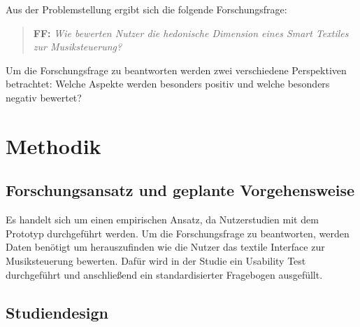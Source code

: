 \documentclass[12pt, a4paper]{article}
\begin{document}
Aus der Problemstellung ergibt sich die folgende Forschungsfrage:
\begin{quote}
  \textbf{FF:} \textit{Wie bewerten Nutzer die hedonische Dimension eines Smart Textiles zur Musiksteuerung?}
\end{quote}

Um die Forschungsfrage zu beantworten werden zwei verschiedene Perspektiven betrachtet: Welche Aspekte werden besonders positiv und welche besonders negativ bewertet?

\section{Methodik}

\subsection{Forschungsansatz und geplante Vorgehensweise}

Es handelt sich um einen empirischen Ansatz, da Nutzerstudien mit dem Prototyp durchgeführt werden. Um die Forschungsfrage zu beantworten, werden Daten benötigt um herauszufinden wie die Nutzer das textile Interface zur Musiksteuerung bewerten. Dafür wird in der Studie ein Usability Test durchgeführt und anschließend ein standardisierter Fragebogen ausgefüllt.

\subsection{Studiendesign} 
\end{document}
